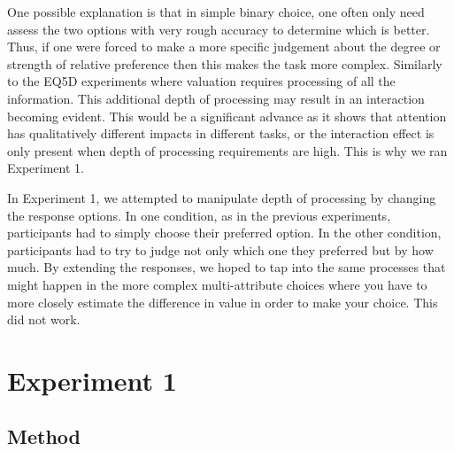 \documentclass[doc, a4paper, apacite]{apa6}
\begin{document}
One possible explanation is that in simple binary choice, one often only need assess the two options with very rough accuracy to determine which is better. 
Thus, if one were forced to make a more specific judgement about the degree or strength of relative preference then this makes the task more complex. 
Similarly to the EQ5D experiments where valuation requires processing of all the information. 
This additional depth of processing may result in an interaction becoming evident. 
This would be a significant advance as it shows that attention has qualitatively different impacts in different tasks, or the interaction effect is only present when depth of processing requirements are high. 
This is why we ran Experiment 1. 

In Experiment 1, we attempted to manipulate depth of processing by changing the response options. 
In one condition, as in the previous experiments, participants had to simply choose their preferred option. 
In the other condition, participants had to try to judge not only which one they preferred but by how much. 
By extending the responses, we hoped to tap into the same processes that might happen in the more complex multi-attribute choices where you have to more closely estimate the difference in value in order to make your choice. 
This did not work. 




\section{Experiment 1} \label{exp:NS01} 
\subsection{Method}
\end{document}
